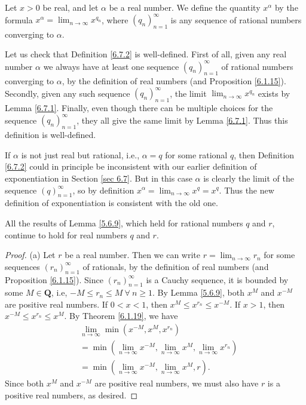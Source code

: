 \begin{definition}\label{6.7.2}
Let \(x > 0\) be real, and let \(\alpha\) be a real number.
We define the quantity \(x^\alpha\) by the formula \(x^\alpha = \lim_{n \to \infty} x^{q_n}\), where \((q_n)_{n = 1}^\infty\) is any sequence of rational numbers converging to \(\alpha\).
\end{definition}

\begin{note}
Let us check that Definition \ref{6.7.2} is well-defined.
First of all, given any real number \(\alpha\) we always have at least one sequence \((q_n)_{n = 1}^\infty\) of rational numbers converging to \(\alpha\), by the definition of real numbers (and Proposition \ref{6.1.15}).
Secondly, given any such sequence \((q_n)_{n = 1}^\infty\), the limit \(\lim_{n \to \infty} x^{q_n}\) exists by Lemma \ref{6.7.1}.
Finally, even though there can be multiple choices for the sequence \((q_n)_{n = 1}^\infty\), they all give the same limit by Lemma \ref{6.7.1}.
Thus this definition is well-defined.
\end{note}

\begin{note}
If \(\alpha\) is not just real but rational, i.e., \(\alpha = q\) for some rational \(q\), then Definition \ref{6.7.2} could in principle be inconsistent with our earlier definition of exponentiation in Section \ref{sec 6.7}.
But in this case \(\alpha\) is clearly the limit of the sequence \((q)_{n = 1}^\infty\), so by definition \(x^\alpha = \lim_{n \to \infty} x^q = x^q\).
Thus the new definition of exponentiation is consistent with the old one.
\end{note}

\begin{proposition}\label{6.7.3}
All the results of Lemma \ref{5.6.9}, which held for rational numbers \(q\) and \(r\), continue to hold for real numbers \(q\) and \(r\).
\end{proposition}

\begin{proof}{(a)}
Let \(r\) be a real number.
Then we can write \(r = \lim_{n \to \infty} r_n\) for some sequences \((r_n)_{n = 1}^\infty\) of rationals, by the definition of real numbers (and Proposition \ref{6.1.15}).
Since \((r_n)_{n = 1}^\infty\) is a Cauchy sequence, it is bounded by some \(M \in \mathbf{Q}\), i.e, \(-M \leq r_n \leq M \ \forall\ n \geq 1\).
By Lemma \ref{5.6.9}, both \(x^M\) and \(x^{-M}\) are positive real numbers.
If \(0 < x < 1\), then \(x^M \leq x^{r_n} \leq x^{-M}\).
If \(x > 1\), then \(x^{-M} \leq x^{r_n} \leq x^M\).
By Theorem \ref{6.1.19}, we have
\begin{align*}
& \lim_{n \to \infty} \min(x^{-M}, x^M, x^{r_n}) \\
&= \min(\lim_{n \to \infty} x^{-M}, \lim_{n \to \infty} x^M, \lim_{n \to \infty} x^{r_n}) \\
&= \min(\lim_{n \to \infty} x^{-M}, \lim_{n \to \infty} x^M, r).
\end{align*}
Since both \(x^M\) and \(x^{-M}\) are positive real numbers, we must also have \(r\) is a positive real numbers, as desired.
\end{proof}


